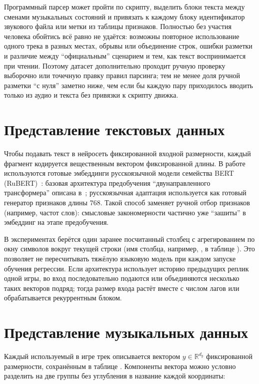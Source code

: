 Программный парсер может пройти по скрипту, выделить блоки текста между сменами музыкальных состояний и привязать к каждому блоку идентификатор звукового файла или метки из таблицы признаков. Полностью без участия человека обойтись всё равно не удаётся: возможны повторное использование одного трека в разных местах, обрывы или объединение строк, ошибки разметки и различие между ``официальным'' сценарием и тем, как текст воспринимается при чтении. Поэтому датасет дополнительно проходит ручную проверку выборочно или точечную правку правил парсинга; тем не менее доля ручной разметки ``с нуля'' заметно ниже, чем если бы каждую пару приходилось вводить только из аудио и текста без привязки к скрипту движка.

\section{Представление текстовых данных}

Чтобы подавать текст в нейросеть фиксированной входной размерности, каждый фрагмент кодируется вещественным вектором фиксированной длины. В работе используются готовые эмбеддинги русскоязычной модели семейства BERT (RuBERT)~\cite{kuratov2019}: базовая архитектура предобучения ``двунаправленного трансформера'' описана в~\cite{devlin2018}; русскоязычная адаптация используется как готовый генератор признаков длины $768$. Такой способ заменяет ручной отбор признаков (например, частот слов): смысловые закономерности частично уже ``зашиты'' в эмбеддинг на этапе предобучения.

В экспериментах берётся один заранее посчитанный столбец с агрегированием по окну символов вокруг текущей строки (имя столбца, например, , в таблице ). Это позволяет не пересчитывать тяжёлую языковую модель при каждом запуске обучения регрессии. Если архитектура использует историю предыдущих реплик одной игры, во вход последовательно подаются или объединяются несколько таких векторов подряд; тогда размер входа растёт вместе с числом лагов или обрабатывается рекуррентным блоком.

\section{Представление музыкальных данных}

Каждый используемый в игре трек описывается вектором $y \in \mathbb{R}^{d_y}$ фиксированной размерности, сохранённым в таблице . Компоненты вектора можно условно разделить на две группы без углубления в название каждой координаты:

